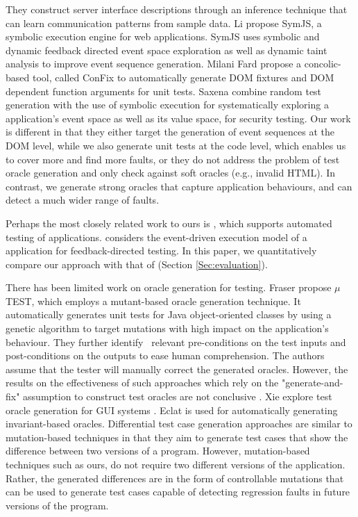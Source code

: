 They construct server interface descriptions through an inference technique that can learn communication patterns from sample data.
Li \etal \cite{li:fse14} propose SymJS, a symbolic execution engine for \javascript web applications. SymJS uses symbolic and dynamic feedback directed event space exploration as well as dynamic taint analysis to improve event sequence generation. 
Milani Fard \etal \cite{milanifard:ase15} propose a concolic-based tool, called ConFix to automatically generate DOM fixtures and DOM dependent function arguments for \javascript unit  tests.
Saxena \etal \cite{song:symb10} combine random test generation with the use of symbolic execution for systematically exploring a \javascript application's event space as well as its value space, for security testing.
Our work is different in that they either target the generation of event sequences at the DOM level, while we also generate unit tests at the \javascript code level, which enables us to cover more and find more faults,
or they do not address the problem of test oracle generation and only check against soft oracles (e.g., invalid HTML). In contrast, we generate strong oracles that capture application behaviours, and can detect a much wider range of faults.

Perhaps the most closely related work to ours is \artemis \cite{artzi:icse11}, which supports automated testing of \javascript applications.
\artemis considers the event-driven execution model of a \javascript application for feedback-directed testing.
In this paper, we quantitatively compare our approach with that of \artemis (Section \ref{Sec:evaluation}).

 \label{Sec:oracleGen}
There has been limited work on oracle generation for testing. 
Fraser \etal \cite{fraser:tse12} propose $\mu$TE\-ST, which employs a mutant-based oracle generation technique.  It automatically generates unit tests for Java object-oriented classes by using a genetic algorithm to target mutations with high impact on the application's behaviour. They further identify~\cite{fraser:issta11} relevant pre-conditions on the test inputs and post-conditions on the outputs to ease human comprehension. The authors assume that the tester will manually correct the generated oracles. However, the results on the effectiveness of such approaches which rely on the "generate-and-fix" assumption to construct test oracles are not conclusive \cite{fraser:issta13}.
Xie \etal explore test oracle generation for GUI systems \cite{xie:tosem07}. 
Eclat \cite{pacheco:ecoop05} is used for automatically generating invariant-based oracles. 
Differential test case generation approaches \cite{taneja:ase08, elbaum:tse09} are similar to mutation-based techniques in that they aim to generate test cases that show the difference between two versions of a program. However, mutation-based techniques such as ours, do not require two different versions of the application.
Rather, the generated differences are in the form of controllable mutations that can be used to generate test cases capable of detecting
regression faults in future versions of the program.

